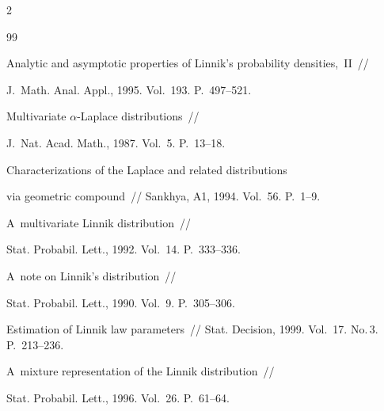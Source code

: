 \begin{multicols}{2}
{{\begin{thebibliography}{99}




Analytic and asymptotic properties of Linnik's probability densities,~II~// 


J.~Math. Anal. Appl., 1995. Vol.~193. P.~497--521.







 Multivariate $\alpha$-Laplace distributions~// 


J.~Nat. Acad. Math., 1987. Vol.~5. P.~13--18.







 Characterizations of the Laplace and related distributions 


via geometric compound~// Sankhya, A1, 1994. Vol.~56. P.~1--9.







 A~multivariate Linnik distribution~// 


Stat. Probabil. Lett., 1992. Vol.~14. P.~333--336.







 A~note on Linnik's distribution~// 


Stat. Probabil. Lett., 1990. Vol.~9. P.~305--306.









Estimation of Linnik law parameters~// Stat. Decision, 1999. Vol.~17. No.\,3. P.~213--236.










 A~mixture representation of the Linnik distribution~// 


Stat. Probabil. Lett., 1996. Vol.~26. P.~61--64.






\end{thebibliography}}}
\end{multicols}
